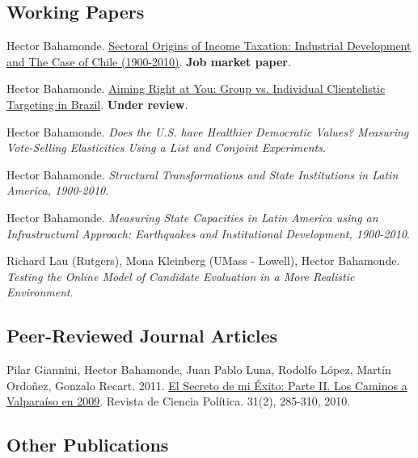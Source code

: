 \documentclass[letterpaper]{article}
\renewenvironment{itemize}{
  \begin{list}{}{
    \setlength{\leftmargin}{1.5em}
  }
}{
  \end{list}
}
\begin{document}
\subsection*{Working Papers}

\begin{itemize}
  \item Hector Bahamonde. \href{http://github.com/hbahamonde/IncomeTaxAdoption/raw/master/Bahamonde_IncomeTaxAdoption.pdf}{Sectoral Origins of Income Taxation: Industrial Development and The Case of Chile (1900-2010)}. {\bf Job market paper}.
  \item Hector Bahamonde. \href{http://github.com/hbahamonde/Clientelism_paper/raw/master/Bahamonde_Clientelism_Paper.pdf}{Aiming Right at You: Group vs. Individual Clientelistic Targeting in Brazil}. {\bf Under review}.
  \item Hector Bahamonde. \emph{Does the U.S. have Healthier Democratic Values? Measuring Vote-Selling Elasticities Using a List and Conjoint Experiments}.
  \item Hector Bahamonde. \emph{Structural Transformations and State Institutions in Latin America, 1900-2010}.
  \item Hector Bahamonde. \emph{Measuring State Capacities in Latin America using an Infrastructural Approach: Earthquakes and Institutional Development, 1900-2010}.
  \item Richard Lau (Rutgers), Mona Kleinberg (UMass - Lowell), Hector Bahamonde. \emph{Testing the Online Model of Candidate Evaluation in a More Realistic Environment}.
\end{itemize}


\subsection*{Peer-Reviewed Journal Articles}

\begin{itemize}
  \item Pilar Giannini, Hector Bahamonde, Juan Pablo Luna, Rodolfo L\'opez, Mart\'in Ordo\~nez, Gonzalo Recart. 2011. \href{http://www.revistacienciapolitica.cl/rcp/wp-content/uploads/2013/09/07_vol_31_2.pdf}{El Secreto de mi \'Exito: Parte II. Los Caminos a Valpara\'iso en 2009}. Revista de Ciencia Pol\'itica. 31(2), 285-310, 2010.
\end{itemize}


\subsection*{Other Publications}
\end{document}
